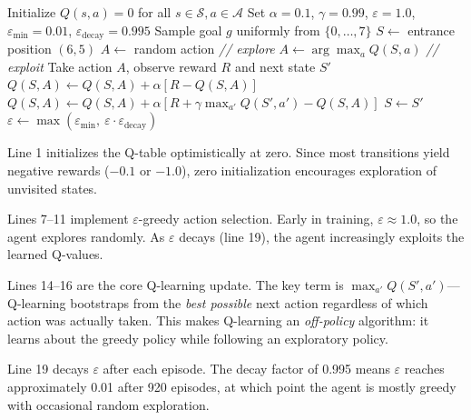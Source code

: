 \documentclass[letterpaper]{article}
\begin{document}
\begin{algorithm}[t]
\caption{Q-Learning with $\varepsilon$-Greedy Exploration}
\label{alg:qlearning}
\begin{algorithmic}[1]
\STATE Initialize $Q(s, a) = 0$ for all $s \in \mathcal{S}, a \in \mathcal{A}$
\STATE Set $\alpha = 0.1$, $\gamma = 0.99$, $\varepsilon = 1.0$, $\varepsilon_{\min} = 0.01$, $\varepsilon_{\text{decay}} = 0.995$
    \STATE Sample goal $g$ uniformly from $\{0, \ldots, 7\}$
    \STATE $S \leftarrow$ entrance position $(6, 5)$
            \STATE $A \leftarrow$ random action \hfill \textit{// explore}
        \ELSE
            \STATE $A \leftarrow \arg\max_a Q(S, a)$ \hfill \textit{// exploit}
        \ENDIF
        \STATE Take action $A$, observe reward $R$ and next state $S'$
            \STATE $Q(S, A) \leftarrow Q(S, A) + \alpha \left[ R - Q(S, A) \right]$
        \ELSE
            \STATE $Q(S, A) \leftarrow Q(S, A) + \alpha \left[ R + \gamma \max_{a'} Q(S', a') - Q(S, A) \right]$
        \ENDIF
        \STATE $S \leftarrow S'$
    \ENDWHILE
    \STATE $\varepsilon \leftarrow \max(\varepsilon_{\min},\ \varepsilon \cdot \varepsilon_{\text{decay}})$
\ENDFOR
\end{algorithmic}
\end{algorithm}

Line 1 initializes the Q-table optimistically at zero. Since most transitions yield negative rewards ($-0.1$ or $-1.0$), zero initialization encourages exploration of unvisited states.

Lines 7--11 implement $\varepsilon$-greedy action selection. Early in training, $\varepsilon \approx 1.0$, so the agent explores randomly. As $\varepsilon$ decays (line 19), the agent increasingly exploits the learned Q-values.

Lines 14--16 are the core Q-learning update. The key term is $\max_{a'} Q(S', a')$---Q-learning bootstraps from the \textit{best possible} next action regardless of which action was actually taken. This makes Q-learning an \textit{off-policy} algorithm: it learns about the greedy policy while following an exploratory policy.

Line 19 decays $\varepsilon$ after each episode. The decay factor of 0.995 means $\varepsilon$ reaches approximately 0.01 after 920 episodes, at which point the agent is mostly greedy with occasional random exploration.
\end{document}
